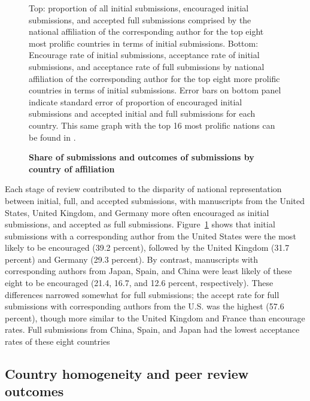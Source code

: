 \documentclass[10pt,letterpaper]{article}
\begin{document}
\begin{figure}[!h]
\caption{\bf Share of submissions and outcomes of submissions by country of affiliation}
Top: proportion of all initial submissions, encouraged initial submissions, and accepted full submissions comprised by the national affiliation of the corresponding author for the top eight most prolific countries in terms of initial submissions. Bottom: Encourage rate of initial submissions, acceptance rate of initial submissions, and acceptance rate of full submissions by national affiliation of the corresponding author for the top eight more prolific countries in terms of initial submissions. Error bars on bottom panel indicate standard error of proportion of encouraged initial submissions and accepted initial and full submissions for each country. This same graph with the top 16 most prolific nations can be found in .
\label{fig6}
\end{figure}

Each stage of review contributed to the disparity of national representation between initial, full, and accepted submissions, with manuscripts from the United States, United Kingdom, and Germany more often encouraged as initial submissions, and accepted as full submissions. Figure~\ref{fig6} shows that initial submissions with a corresponding author from the United States were the most likely to be encouraged (39.2 percent), followed by the United Kingdom (31.7 percent) and Germany (29.3 percent). By contrast, manuscripts with corresponding authors from Japan, Spain, and China were least likely of these eight to be encouraged (21.4, 16.7, and 12.6 percent, respectively). These differences narrowed somewhat for full submissions; the accept rate for full submissions with corresponding authors from the U.S. was the highest (57.6 percent), though more similar to the United Kingdom and France than encourage rates. Full submissions from China, Spain, and Japan had the lowest acceptance rates of these eight countries

\subsection*{Country homogeneity and peer review outcomes}
\end{document}
